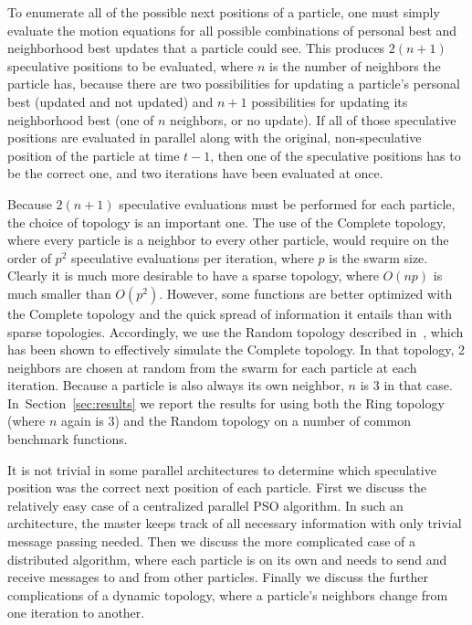 \documentclass[conference,letterpaper]{IEEEtran}
\renewcommand{\sec}[1]{Section~\ref{sec:#1}}
\begin{document}
To enumerate all of the possible next positions of a particle, one must simply
evaluate the motion equations for all possible combinations of personal best
and neighborhood best updates that a particle could see.  This produces
$2(n+1)$ speculative positions to be evaluated, where $n$ is the number of
neighbors the particle has, because there are two possibilities for updating a
particle's personal best (updated and not updated) and $n+1$ possibilities for
updating its neighborhood best (one of $n$ neighbors, or no update).  If all of
those speculative positions are evaluated in parallel along with the original,
non-speculative position of the particle at time $t-1$, then one of the
speculative positions has to be the correct one, and two iterations have been
evaluated at once.

Because $2(n+1)$ speculative evaluations must be performed for each particle,
the choice of topology is an important one.  The use of the Complete topology,
where every particle is a neighbor to every other particle, would require on
the order of $p^2$ speculative evaluations per iteration, where $p$ is the
swarm size.  Clearly it is much more desirable to have a sparse topology, where
$O(np)$ is much smaller than $O(p^2)$.  However, some functions are better
optimized with the Complete topology and the quick spread of information it
entails than with sparse topologies.  Accordingly, we use the Random topology
described in~\cite{mcnabb-cec09}, which has been shown to effectively simulate
the Complete topology.  In that topology, 2 neighbors are chosen at random from
the swarm for each particle at each iteration.  Because a particle is also
always its own neighbor, $n$ is $3$ in that case.  In~\sec{results} we report
the results for using both the Ring topology (where $n$ again is $3$) and the
Random topology on a number of common benchmark functions.

It is not trivial in some parallel architectures to determine which speculative
position was the correct next position of each particle.  First we discuss the
relatively easy case of a centralized parallel PSO algorithm.  In such an
architecture, the master keeps track of all necessary information with only
trivial message passing needed.  Then we discuss the more complicated case of a
distributed algorithm, where each particle is on its own and needs to send and
receive messages to and from other particles.  Finally we discuss the further
complications of a dynamic topology, where a particle's neighbors change from
one iteration to another.
\end{document}
